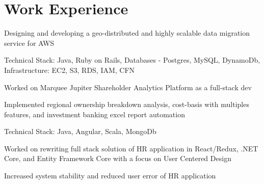 \documentclass[]{deedy-resume-openfont}
\begin{document}
\begin{minipage}[t]{0.32\textwidth}
\sectionsep

%
%

\end{minipage}
\hfill
\begin{minipage}[t]{0.66\textwidth}


\section{Work Experience}

\vspace{\topsep} %
\begin{tightemize}\item Designing and developing a geo-distributed and highly scalable data migration service for AWS

\item Technical Stack: Java, Ruby on Rails, Databases - Postgres, MySQL, DynamoDb,
Infrastructure: EC2, S3, RDS, IAM, CFN
\end{tightemize}
\sectionsep



\begin{tightemize}\item Worked on Marquee Jupiter Shareholder Analytics Platform as a full-stack dev \item Implemented regional ownership breakdown analysis, cost-basis with multiples features, and investment banking excel report automation \item Technical Stack: Java, Angular, Scala, MongoDb
\end{tightemize}
\sectionsep

\begin{tightemize}
\item Worked on rewriting full stack solution of HR application in React/Redux, .NET Core, and Entity Framework Core with a focus on User Centered Design \item Increased system stability and reduced user error of HR application
\end{tightemize}
\sectionsep


\end{minipage}
\end{document}
